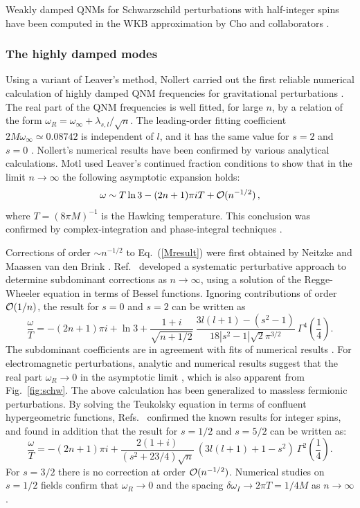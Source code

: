 \documentclass[]{iopart}
\def\be{\begin{equation}}
\def\ee{\end{equation}}
\begin{document}
Weakly damped QNMs for Schwarzschild perturbations with half-integer spins
have been computed in the WKB approximation by Cho and collaborators
\cite{Cho:2003qe,Cho:2004wj}.

\subsubsection*{The highly damped modes}

Using a variant of Leaver's method, Nollert carried out the first reliable
numerical calculation of highly damped QNM frequencies for gravitational
perturbations \cite{Nollertlargen}. The real part of the QNM frequencies is
well fitted, for large $n$, by a relation of the form
$\omega_R=\omega_{\infty}+\lambda_{s,l}/\sqrt{n}$. The leading-order fitting
coefficient $2M\omega_{\infty}\simeq 0.08742$ is independent of $l$, and it
has the same value for $s=2$ and $s=0$ \cite{Berti:2003zu}. Nollert's
numerical results have been confirmed by various analytical calculations. Motl
\cite{Motl:2002hd} used Leaver's continued fraction conditions to show that in
the limit $n\rightarrow \infty$ the following asymptotic expansion holds:
%
\be\label{Mresult}
\omega\sim{T \ln 3}-(2n+1)\pi i T+{\cal O}(n^{-1/2})\,,
\ee
%
where $T=(8\pi M)^{-1}$ is the Hawking temperature.  This conclusion was
confirmed by complex-integration \cite{Motl:2003cd} and phase-integral
techniques \cite{Andersson:2003fh}.

Corrections of order $\sim n^{-1/2}$ to Eq.~(\ref{Mresult}) were first
obtained by Neitzke \cite{Neitzke:2003mz} and Maassen van den Brink
\cite{MaassenvandenBrink:2003as}. Ref.~\cite{Musiri:2003bv} developed a
systematic perturbative approach to determine subdominant corrections as $n\to
\infty$, using a solution of the Regge-Wheeler equation in terms of Bessel
functions. Ignoring contributions of order ${\cal O}(1/n)$, the result for
$s=0$ and $s=2$ can be written as 
%
\be
\label{eqfs02} 
\frac{\omega}{T} = 
-(2n+1)\pi i + \ln 3 + 
\frac{1+i}{\sqrt{n+1/2}} \ 
\frac{3l(l +1) -(s^2-1)}{18|s^2-1|\sqrt 2 \pi^{3/2}}
\ \Gamma^4 \left(\frac{1}{4}\right).
\ee
%
The subdominant coefficients are in agreement with fits of numerical results
\cite{Nollertlargen,Berti:2003zu,Cardoso:2003vt}.  For electromagnetic
perturbations, analytic and numerical results suggest that the real part
$\omega_R\to 0$ in the asymptotic limit \cite{Motl:2003cd,Cardoso:2003vt},
which is also apparent from Fig.~\ref{fig:schw}.  The above calculation has
been generalized to massless fermionic perturbations.  By solving the
Teukolsky equation in terms of confluent hypergeometric functions,
Refs.~\cite{Musiri:2006ta,Musiri:2007zz} confirmed the known results for
integer spins, and found in addition that the result for $s=1/2$ and $s=5/2$
can be written as:
%
\be
\frac{\omega}{T}=
-(2n+1) \pi i +\frac{2(1+i)}{(s^2+23/4)\sqrt{n}}\ 
\left(3l(l+1)+1-s^2\right)\ \Gamma^2\left( \frac{1}{4} \right).
\ee
%
For $s=3/2$ there is no correction at order ${\cal O}(n^{-1/2})$.  Numerical
studies on $s=1/2$ fields confirm that $\omega_R \to 0$ and the spacing
$\delta \omega_I \to 2\pi T=1/4M$ as $n\to \infty$ \cite{Jing:2005dt}.
\end{document}
